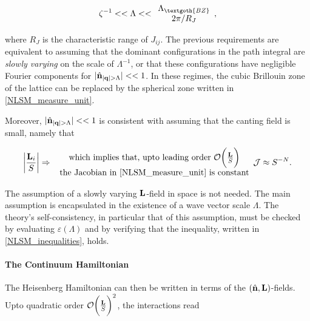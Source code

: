 \begin{equation}
    \zeta^{-1} << \Lambda << \begin{array}{cc}
         \Lambda_{\textgoth{BZ}} \\
         {2\pi}/{R_J}
    \end{array},
    \label{NLSM_inequalities}
\end{equation}
    
where $R_J$ is the characteristic range of $J_{ij}$. The previous requirements are equivalent to assuming that the dominant configurations in the path integral are \textit{slowly varying} on the scale of $\Lambda^{-1}$, or that these configurations have negligible Fourier components for $|\hat{\bf n}_{|{\bf q}| > \Lambda}| << 1$. In these regimes, the cubic Brillouin zone of the lattice can be replaced by the spherical zone written in \cref{NLSM_measure_unit}. 

Moreover, $|\hat{\bf n}_{|{\bf q}| > \Lambda}| << 1$ is consistent with assuming that the canting field is small, namely that 

$$
\bigg|\frac{{\bf L}_i}{S}\bigg| \Rightarrow \begin{array}{cc}
     \textnormal{ which implies that, upto leading order } \mathcal{O}\bigg(\frac{{\bf L}}{S}\bigg)  \\
     \textnormal{ the Jacobian in \cref{NLSM_measure_unit} is constant}
\end{array} \mathcal{J} \approx S^{-N}.
$$

The assumption of a slowly varying ${\bf L}$-field in space is not needed. The main assumption is encapsulated in the existence of a wave vector scale $\Lambda$. The theory's self-consistency, in particular that of this assumption, must be checked by evaluating $\varepsilon(\Lambda)$ and by verifying that the inequality, written in \cref{NLSM_inequalities}, holds. \\

\paragraph{The Continuum Hamiltonian}

The Heisenberg Hamiltonian can then be written in terms of the $(\hat{\bf n}, {\bf L})$-fields. Upto quadratic order $\mathcal{O}\bigg(\frac{{\bf L}}{S}\bigg)^2$, the interactions read

